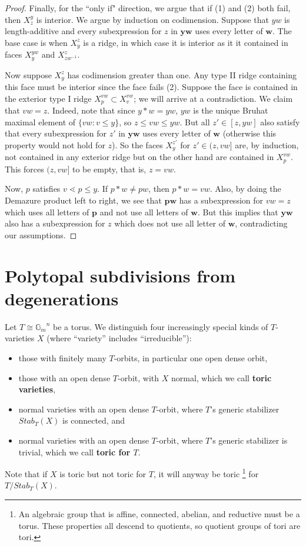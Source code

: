 \documentclass[11pt]{amsart}
\theoremstyle{definition}
\newcommand\defn[1]{{\bf #1}}
\def\bw{\mathbf{w}}
\newcommand\Gm{{\mathbb G}_m}
\newcommand\iso\cong
\begin{document}
\begin{proof}
	Finally, for the ``only if" direction, we argue that if (1) and (2) both fail, then $X^y_z$ is interior. We argue by induction on codimension. Suppose that $yw$ is length-additive and every subexpression for $z$ in $\mathbf{y}\bw$ uses every letter of $\bw$. The base case is when $X_y^z$ is a ridge, in which case it is interior as it it contained in faces $X_y^{yw}$ and $X_{zw^{-1}}^z$. 
	
	Now suppose $X_y^z$ has codimension greater than one. Any type II ridge containing this face must be interior since the face fails (2). Suppose the face is contained in the exterior type I ridge $X_p^{vw} \subset X_v^{vw}$; we will arrive at a contradiction. We claim that $vw=z$. Indeed, note that since $y * w = yw$, $yw$ is the unique Bruhat maximal element of $\{vw: v \leq y\}$, so $z \leq vw \leq yw$.
	But all $z' \in [z, yw]$ also satisfy that every subexpression for $z'$ in $\mathbf{y}\bw$ uses every letter of $\bw$ (otherwise this property would not hold for $z$). So the faces $X_y^{z'}$ for $z' \in (z, vw]$ are, by induction, not contained in any exterior ridge but on the other hand are contained in $X_p^{vw}$. This forces $(z, vw]$ to be empty, that is, $z=vw$.
	
	Now, $p$ satisfies $v \lessdot p \leq y$. If $p*w \neq pw$, then $p*w=vw$. Also, by doing the Demazure product left to right, we see that $\mathbf{p} \bw$ has a subexpression for $vw=z$ which uses all letters of $\mathbf{p}$ and not use all letters of $\bw$. But this implies that $\mathbf{y} \bw$ also has a subexpression for $z$ which does not use all letter of $\bw$, contradicting our assumptions.	
\end{proof}



\section{Polytopal subdivisions from degenerations} \label{sec:subdiv-from-degen}

Let $T \iso {\Gm}^n$ be a torus. We distinguish four increasingly
special kinds of $T$-varieties $X$ (where ``variety'' includes ``irreducible''):
\begin{itemize}
\item those with finitely many $T$-orbits, in particular one open dense orbit,
\item those with an open dense $T$-orbit, with $X$ normal, which we
  call \defn{toric varieties},
\item normal varieties with an open dense $T$-orbit, where $T$'s generic
  stabilizer $Stab_T(X)$ is connected, and
\item normal varieties with an open dense $T$-orbit, where $T$'s generic
  stabilizer is trivial, which we call \defn{toric for $T$}.
\end{itemize}
Note that if $X$ is toric but not toric for $T$, it will anyway be toric%
\footnote{An algebraic group that is affine, connected, abelian, and
  reductive must be a torus. These properties all descend to
  quotients, so quotient groups of tori are tori.}
for $T/Stab_T(X)$.
\end{document}
